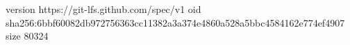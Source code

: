 version https://git-lfs.github.com/spec/v1
oid sha256:6bbf60082db972756363cc11382a3a374e4860a528a5bbc4584162e774ef4907
size 80324
